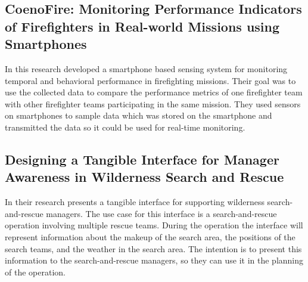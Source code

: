 \documentclass[../Main/thesis.tex]{subfiles}
\begin{document}
\subsection{CoenoFire: Monitoring Performance Indicators of Firefighters in Real-world Missions using Smartphones}
In this research \citet{Feese2013} developed a smartphone based sensing system for monitoring temporal and behavioral performance in firefighting missions.
Their goal was to use the collected data to compare the performance metrics of one firefighter team with other firefighter teams participating in the same mission.
They used sensors on smartphones to sample data which was stored on the smartphone and transmitted the data so it could be used for real-time monitoring.

\subsection{Designing a Tangible Interface for Manager Awareness in Wilderness Search and Rescue}
In their research \citet{Jones2018} presents a tangible interface for supporting wilderness search-and-rescue managers.
The use case for this interface is a search-and-rescue operation involving multiple rescue teams. 
During the operation the interface will represent information about the makeup of the search area, the positions of the search teams, and the weather in the search area.
The intention is to present this information to the search-and-rescue managers, so they can use it in the planning of the operation.

\blankpage
\end{document}
